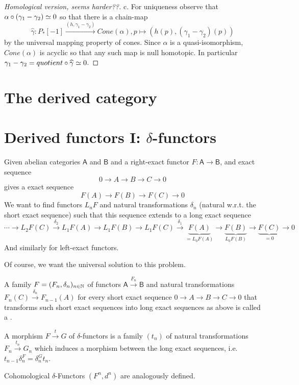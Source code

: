 \documentclass[fontsize=11pt,fleqn,a4paper]{scrartcl}
\begin{document}
\begin{proof}[Homological version, seems harder??]
\medbreak
c. For uniqueness observe that $\alpha\circ(\gamma_1-\gamma_2) \overset{}{\simeq} 0$ so that there is a chain-map
\[\widehat{\gamma}: P_\ast[-1] \xrightarrow{(h,\gamma_1-\gamma_2)} Cone(\alpha), p \mapsto (h(p), (\gamma_1-\gamma_2)(p))\]
by the universal mapping property of cones. Since $\alpha$ is a quasi-isomorphism, $Cone(\alpha)$ is acyclic so that any such map is null homotopic. In particular $\gamma_1-\gamma_2 = quotient\circ \widehat{\gamma} \overset{}{\simeq} 0$.
\end{proof}

\section{The derived category}


\section{Derived functors I: \texorpdfstring{$\delta$}{δ}-functors}

\begin{remark}
Given abelian categories $\mathsf{A}$ and $\mathsf{B}$ and a right-exact functor $F: \mathsf{A} \to \mathsf{B}$, and exact sequence
\[0\to A \to B \to C \to 0\]
gives a exact sequence
\[F(A) \to F(B) \to F(C) \to 0\]
We want to find functors $L_nF$ and natural transformations $\delta_n$ (natural w.r.t. the short exact sequence) such that this sequence extends to a long exact sequence
\[\cdots \to L_2F(C) \xrightarrow{\delta_2} L_1F(A) \to L_1F(B) \to L_1F(C) \xrightarrow{\delta_1} \underbrace{F(A)}_{=L_0F(A)} \to \underbrace{F(B)}_{L_0F(B)} \to \underbrace{F(C)}_{=0} \to 0\]
And similarly for left-exact functors.

Of course, we want the universal solution to this problem.
\end{remark}

\begin{definition}
A family $F=(F_n,\delta_n)_{n\in\mathbb{N}}$ of functors $\mathsf{A} \xrightarrow{F_n} \mathsf{B}$ and natural transformations $F_n(C) \xrightarrow{\delta_n} F_{n-1}(A)$ for every short exact sequence $0\to A\to B\to C\to 0$ that transforms such short exact sequences into long exact sequences as above is called a .

A morphism $F\xrightarrow{t}G$ of $\delta$-functors is a family $(t_n)$ of natural transformations $F_n \xrightarrow{t_n} G_n$ which induces a morphism between the long exact sequences, i.e. $t_{n-1}\delta_n^F = \delta_n^G t_n$.

\medbreak
Cohomological $\delta$-Functors $(F^n,d^n)$ are analogously defined.
\end{definition}
\end{document}
